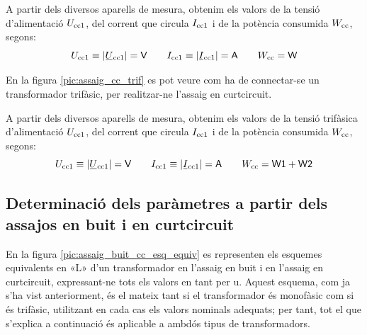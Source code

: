 A partir dels diversos aparells de mesura, obtenim els valors de la
tensió d'alimentació $U_\mathrm{cc1}$, del corrent que circula
$I_\mathrm{cc1}$ i de la potència consumida $W_\mathrm{cc}$, segons:
\begin{equation}
    U\ped{cc1}\equiv|\cmplx{U}\ped{cc1}|=\textsf{V} \qquad
    I\ped{cc1}\equiv|\cmplx{I}\ped{cc1}|=\textsf{A}
     \qquad W\ped{cc}=\textsf{W}
\end{equation}

En la figura \vref{pic:assaig_cc_trif} es pot veure com ha de
connectar-se un transformador trifàsic, per realitzar-ne l'assaig en curtcircuit.

\begin{center}
    
    \label{pic:assaig_cc_trif}
\end{center}


A partir dels diversos aparells de mesura, obtenim els valors de la
tensió trifàsica d'alimentació $U_\mathrm{cc1}$, del corrent que circula
$I_\mathrm{cc1}$ i de la potència consumida $W_\mathrm{cc}$, segons:
\begin{equation}
    U\ped{cc1}\equiv|\cmplx{U}\ped{cc1}|=\textsf{V} \qquad
    I\ped{cc1}\equiv|\cmplx{I}\ped{cc1}|=\textsf{A} \qquad
    W\ped{cc}=\textsf{W1}+\textsf{W2}
\end{equation}

\subsection{Determinació dels paràmetres a partir dels assajos en buit i en curtcircuit}

En la figura \vref{pic:assaig_buit_cc_esq_equiv}  es representen els
esquemes equivalents en «L» d'un transformador en l'assaig en buit i
en l'assaig en curtcircuit, expressant-ne tots els valors en tant per u.
Aquest esquema, com ja s'ha vist anteriorment, és el mateix tant si
el transformador és monofàsic com si és trifàsic, utilitzant en cada
cas els valors nominals adequats; per tant, tot el que s'explica  a
continuació és aplicable a ambdós tipus de transformadors.

\begin{center}
    
     \label{pic:assaig_buit_cc_esq_equiv}
\end{center}

